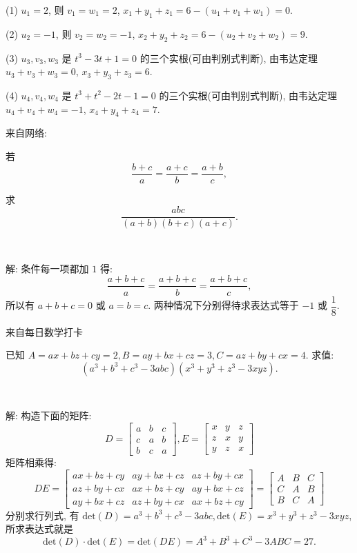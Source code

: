 (1) $u_1 = 2$, 则 $v_1 = w_1 = 2$, $x_1+y_1+z_1 = 6 - (u_1+v_1+w_1) = 0.$

(2) $u_2 = -1$, 则 $v_2 = w_2 = -1$, $x_2+y_2+z_2 = 6 - (u_2+v_2+w_2) = 9.$

(3) $u_3, v_3, w_3$ 是 $t^3-3t+1=0$ 的三个实根(可由判别式判断), 由韦达定理 $u_3+v_3+w_3 = 0$, $x_3+y_3+z_3 = 6$.

(4) $u_4, v_4, w_4$ 是 $t^3+t^2-2t-1=0$ 的三个实根(可由判别式判断), 由韦达定理 $u_4+v_4+w_4 = -1$, $x_4+y_4+z_4 = 7$.


\newpage
\noindent 来自网络: 

若 $$\dfrac{b+c}{a}=\dfrac{a+c}{b}=\dfrac{a+b}{c},$$ 

求 $$\dfrac{abc}{(a+b)(b+c)(a+c)}.$$

~

解: 条件每一项都加 $1$ 得:
$$ \frac{a+b+c}{a}=\frac{a+b+c}{b}=\frac{a+b+c}{c} ,$$ 
所以有 $a+b+c=0$ 或 $a=b=c$. 
两种情况下分别得待求表达式等于 $-1$ 或 $\dfrac{1}{8}$.


\newpage
\noindent 来自每日数学打卡

已知 $A = ax + bz + cy = 2, B = ay + bx + cz = 3, C = az + by + cx = 4$. 求值:
\[(a^3+b^3+c^3-3abc)(x^3+y^3+z^3-3xyz) .\]

~

解: 构造下面的矩阵:
\[
D = \begin{bmatrix}
a & b & c \\
c & a & b \\
b & c & a
\end{bmatrix}, 
E = \begin{bmatrix}
x & y & z \\
z & x & y \\
y & z & x
\end{bmatrix}
\]
矩阵相乘得:
\[
DE = \begin{bmatrix}
ax+bz+cy & ay+bx+cz & az+by+cx \\
az+by+cx & ax+bz+cy & ay+bx+cz \\
ay+bx+cz & az+by+cx & ax+bz+cy 
\end{bmatrix} = 
\begin{bmatrix}
A & B & C\\
C & A & B\\
B & C & A 
\end{bmatrix}
\]
分别求行列式, 有 $\mathrm{det}(D) = a^3 + b^3 + c^3 - 3abc, \mathrm{det}(E) = x^3+y^3+z^3-3xyz$, 所求表达式就是 
\[ \mathrm{det}(D)\cdot\mathrm{det}(E) = \mathrm{det}(DE) = A^3+B^3+C^3-3ABC = 27 . \]

